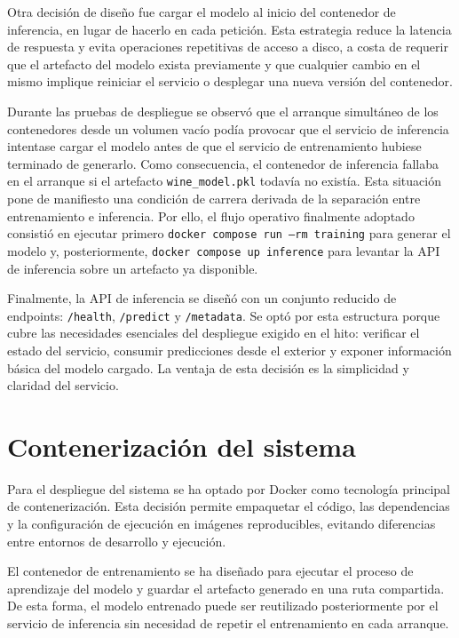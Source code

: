 Otra decisi\'on de dise\~no fue cargar el modelo al inicio del contenedor de inferencia, en lugar de hacerlo en cada petici\'on. Esta
estrategia reduce la latencia de respuesta y evita operaciones repetitivas de acceso a disco, a costa de requerir que el artefacto del
modelo exista previamente y que cualquier cambio en el mismo implique reiniciar el servicio o desplegar una nueva versi\'on del contenedor.

Durante las pruebas de despliegue se observ\'o que el arranque simult\'aneo de los contenedores desde un volumen vac\'io pod\'ia provocar 
que el servicio de inferencia intentase cargar el modelo antes de que el servicio de entrenamiento hubiese terminado de generarlo. Como 
consecuencia, el contenedor de inferencia fallaba en el arranque si el artefacto \texttt{wine\_model.pkl} todav\'ia no exist\'ia. Esta 
situaci\'on pone de manifiesto una condici\'on de carrera derivada de la separaci\'on entre entrenamiento e inferencia. Por ello, el flujo 
operativo finalmente adoptado consisti\'o en ejecutar primero \texttt{docker compose run --rm training} para generar el modelo y, 
posteriormente, \texttt{docker compose up inference} para levantar la API de inferencia sobre un artefacto ya disponible.

Finalmente, la API de inferencia se dise\~n\'o con un conjunto reducido de endpoints: \texttt{/health}, \texttt{/predict} y
\texttt{/metadata}. Se opt\'o por esta estructura porque cubre las necesidades esenciales del despliegue exigido en el hito: verificar el
estado del servicio, consumir predicciones desde el exterior y exponer informaci\'on b\'asica del modelo cargado. La ventaja de esta
decisi\'on es la simplicidad y claridad del servicio.

\section{Contenerizaci\'on del sistema}

Para el despliegue del sistema se ha optado por Docker como tecnolog\'ia principal de contenerizaci\'on. Esta decisi\'on permite empaquetar
el c\'odigo, las dependencias y la configuraci\'on de ejecuci\'on en im\'agenes reproducibles, evitando diferencias entre entornos de
desarrollo y ejecuci\'on.

El contenedor de entrenamiento se ha dise\~nado para ejecutar el proceso de aprendizaje del modelo y guardar el artefacto generado en una
ruta compartida. De esta forma, el modelo entrenado puede ser reutilizado posteriormente por el servicio de inferencia sin necesidad de
repetir el entrenamiento en cada arranque.


